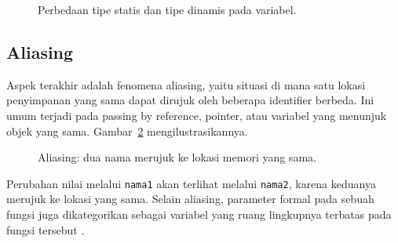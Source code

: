 \documentclass[11pt,a4paper]{article}
\begin{document}
\begin{figure}[H]
	\centering
	\caption{Perbedaan tipe statis dan tipe dinamis pada variabel.}
	\label{fig:typing}
\end{figure}

\subsection{Aliasing}

Aspek terakhir adalah fenomena aliasing, yaitu situasi di mana satu lokasi penyimpanan yang sama dapat dirujuk oleh beberapa identifier berbeda. Ini umum terjadi pada passing by reference, pointer, atau variabel yang menunjuk objek yang sama. Gambar~\ref{fig:aliasing} mengilustrasikannya.

\begin{figure}[H]
	\centering
	\caption{Aliasing: dua nama merujuk ke lokasi memori yang sama.}
	\label{fig:aliasing}
\end{figure}

Perubahan nilai melalui \texttt{nama1} akan terlihat melalui \texttt{nama2}, karena keduanya merujuk ke lokasi yang sama. Selain aliasing, parameter formal pada sebuah fungsi juga dikategorikan sebagai variabel yang ruang lingkupnya terbatas pada fungsi tersebut \cite{wikipedia_cs}.
\end{document}
